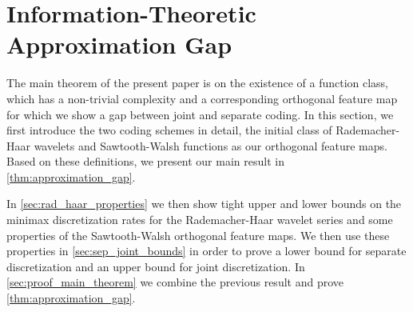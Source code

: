 \documentclass[twoside,11pt]{article}
\begin{document}
\section{Information-Theoretic Approximation Gap}
The main theorem of the present paper is on the existence of a function class, which has a non-trivial complexity and a corresponding orthogonal feature map for which we show a gap between joint and separate coding.
In this section, we first introduce the two coding schemes in detail, the initial class of Rademacher-Haar wavelets and Sawtooth-Walsh functions as our orthogonal feature maps.
Based on these definitions, we present our main result in \cref{thm:approximation_gap}.

In \cref{sec:rad_haar_properties} we then show tight upper and lower bounds on the minimax discretization rates for the Rademacher-Haar wavelet series and some properties of the Sawtooth-Walsh orthogonal feature maps.
We then use these properties in \cref{sec:sep_joint_bounds} in order to prove a lower bound for separate discretization and an upper bound for joint discretization.
In \cref{sec:proof_main_theorem} we combine the previous result and prove \cref{thm:approximation_gap}.
\end{document}
